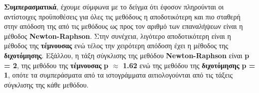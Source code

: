 \documentclass[First Project.tex]{subfiles}
\begin{document}
\textbf{Συμπερασματικά}, έχουμε σύμφωνα με το δείγμα ότι έφοσον πληρούνται οι αντίστοιχες προϋποθέσεις για όλες τις μεθόδους η αποδοτικότερη και πιο σταθερή
στην απόδοση της από τις μεθόδους ως προς τον αριθμό των επαναλήψεων είναι η μέθοδος \textlatin{\textbf{Newton-Raphson}}. Στην συνέχεια, λιγότερο αποδοτικότερη είναι η μέθοδος της \textbf{τέμνουσας}
ενώ τέλος την χειρότερη απόδοση έχει η μέθοδος της \textbf{διχοτόμησης}. Εξάλλου, η τάξη σύγκλισης της μεθόδου \textlatin{\textbf{Newton-Raphson}} είναι
\textbf{\textlatin{p} = 2}, της μεθόδου της \textbf{τέμνουσας} \textbf{\textlatin{p} $\approx$ 1.62} ενώ της μεθόδου της \textbf{διχοτόμησης} \textbf{\textlatin{p} = 1}, οπότε τα συμπεράσματα από τα 
ιστογράμματα αιτιολογούνται από τις τάξεις σύγκλισης της κάθε μεθόδου.
 
\end{document}
